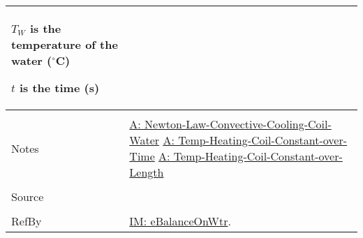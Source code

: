 \documentclass[12pt]{article}
\begin{document}
\begin{minipage}{\textwidth}
\begin{tabular}{p{} p{}}
\begin{symbDescription}
                                                  \item{${T_{W}}$ is the temperature of the water (${}^{\circ}$C)}
                                                  \item{$t$ is the time (s)}
                                                  \end{symbDescription}
                                                  \\ \midrule \\
                                                  Notes & \hyperref[A:Newton-Law-Convective-Cooling-Coil-Water]{A: Newton-Law-Convective-Cooling-Coil-Water}
                                                          \hyperref[A:Temp-Heating-Coil-Constant-over-Time]{A: Temp-Heating-Coil-Constant-over-Time}
                                                          \hyperref[A:Temp-Heating-Coil-Constant-over-Length]{A: Temp-Heating-Coil-Constant-over-Length}
                                                          \\ \midrule \\
                                                          Source & \cite{koothoor2013}
                                                                   \\ \midrule \\
                                                                   RefBy & \hyperref[IM:eBalanceOnWtr]{IM: eBalanceOnWtr}.
\\ \bottomrule \end{tabular}
\end{minipage}\\
\end{document}
